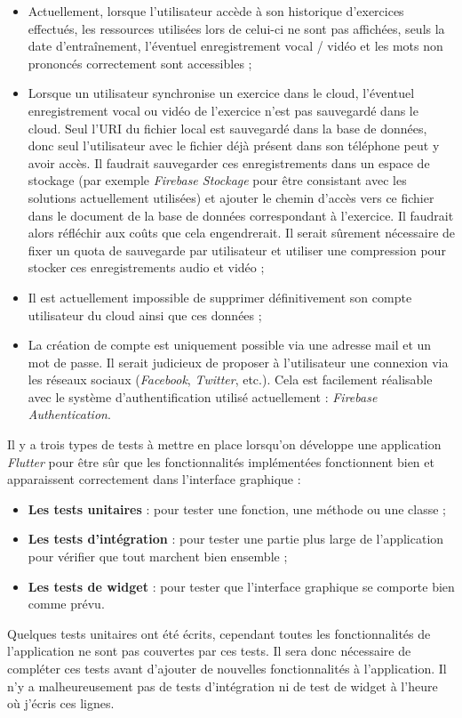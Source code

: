 \begin{itemize}
  \item Actuellement, lorsque l'utilisateur accède à son historique d'exercices effectués, les ressources utilisées lors de celui-ci ne sont pas affichées, seuls la date d'entraînement, l'éventuel enregistrement vocal / vidéo et les mots non prononcés correctement sont accessibles ;
  \item Lorsque un utilisateur synchronise un exercice dans le cloud, l'éventuel enregistrement vocal ou vidéo de l'exercice n'est pas sauvegardé dans le cloud. Seul l'URI du fichier local est sauvegardé dans la base de données, donc seul l'utilisateur avec le fichier déjà présent dans son téléphone peut y avoir accès. Il faudrait sauvegarder ces enregistrements dans un espace de stockage (par exemple \textit{Firebase Stockage} pour être consistant avec les solutions actuellement utilisées) et ajouter le chemin d'accès vers ce fichier dans le document de la base de données correspondant à l'exercice. Il faudrait alors réfléchir aux coûts que cela engendrerait. Il serait sûrement nécessaire de fixer un quota de sauvegarde par utilisateur et utiliser une compression pour stocker ces enregistrements audio et vidéo ;
  \item Il est actuellement impossible de supprimer définitivement son compte utilisateur du cloud ainsi que ces données ;
  \item La création de compte est uniquement possible via une adresse mail et un mot de passe. Il serait judicieux de proposer à l'utilisateur une connexion via les réseaux sociaux (\textit{Facebook}, \textit{Twitter}, etc.). Cela est facilement réalisable avec le système d'authentification utilisé actuellement : \textit{Firebase Authentication}.
\end{itemize}

Il y a trois types de tests à mettre en place lorsqu'on développe une application \textit{Flutter} pour être sûr que les fonctionnalités implémentées fonctionnent bien et apparaissent correctement dans l'interface graphique :

\begin{itemize}
  \item \textbf{Les tests unitaires} : pour tester une fonction, une méthode ou une classe ;
  \item \textbf{Les tests d'intégration} : pour tester une partie plus large de l'application pour vérifier que tout marchent bien ensemble ;
  \item \textbf{Les tests de widget} : pour tester que l'interface graphique se comporte bien comme prévu.
\end{itemize}

Quelques tests unitaires ont été écrits, cependant toutes les fonctionnalités de l'application ne sont pas couvertes par ces tests. Il sera donc nécessaire de compléter ces tests avant d'ajouter de nouvelles fonctionnalités à l'application. Il n'y a malheureusement pas de tests d'intégration ni de test de widget à l'heure où j'écris ces lignes.





